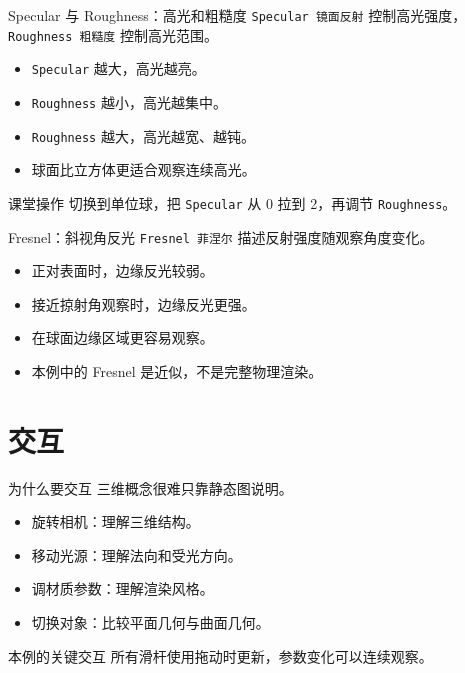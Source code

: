 \documentclass[aspectratio=169,11pt]{ctexbeamer}
\begin{document}
\begin{frame}{Specular 与 Roughness：高光和粗糙度}
  \texttt{Specular 镜面反射} 控制高光强度，\texttt{Roughness 粗糙度} 控制高光范围。

  \begin{itemize}
    \item \texttt{Specular} 越大，高光越亮。
    \item \texttt{Roughness} 越小，高光越集中。
    \item \texttt{Roughness} 越大，高光越宽、越钝。
    \item 球面比立方体更适合观察连续高光。
  \end{itemize}

  \begin{block}{课堂操作}
    切换到单位球，把 \texttt{Specular} 从 0 拉到 2，再调节 \texttt{Roughness}。
  \end{block}
\end{frame}

\begin{frame}{Fresnel：斜视角反光}
  \texttt{Fresnel 菲涅尔} 描述反射强度随观察角度变化。

  \begin{itemize}
    \item 正对表面时，边缘反光较弱。
    \item 接近掠射角观察时，边缘反光更强。
    \item 在球面边缘区域更容易观察。
    \item 本例中的 Fresnel 是近似，不是完整物理渲染。
  \end{itemize}
\end{frame}

\section{交互}

\begin{frame}{为什么要交互}
  三维概念很难只靠静态图说明。

  \begin{itemize}
    \item 旋转相机：理解三维结构。
    \item 移动光源：理解法向和受光方向。
    \item 调材质参数：理解渲染风格。
    \item 切换对象：比较平面几何与曲面几何。
  \end{itemize}

  \begin{block}{本例的关键交互}
    所有滑杆使用拖动时更新，参数变化可以连续观察。
  \end{block}
\end{frame}
\end{document}
